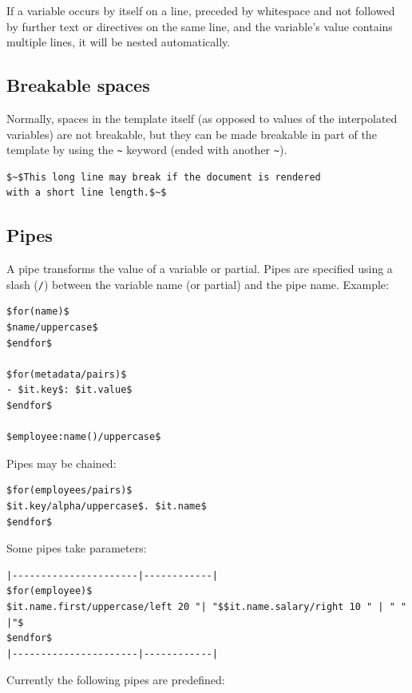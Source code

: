 \documentclass[
  b5paper
]{book}
\begin{document}
If a variable occurs by itself on a line, preceded by whitespace and not
followed by further text or directives on the same line, and the
variable's value contains multiple lines, it will be nested
automatically.

\subsection{Breakable spaces}\label{breakable-spaces}

Normally, spaces in the template itself (as opposed to values of the
interpolated variables) are not breakable, but they can be made
breakable in part of the template by using the
\texttt{\textasciitilde{}} keyword (ended with another
\texttt{\textasciitilde{}}).

\begin{verbatim}
$~$This long line may break if the document is rendered
with a short line length.$~$
\end{verbatim}

\subsection{Pipes}\label{pipes}

A pipe transforms the value of a variable or partial. Pipes are
specified using a slash (\texttt{/}) between the variable name (or
partial) and the pipe name. Example:

\begin{verbatim}
$for(name)$
$name/uppercase$
$endfor$

$for(metadata/pairs)$
- $it.key$: $it.value$
$endfor$

$employee:name()/uppercase$
\end{verbatim}

Pipes may be chained:

\begin{verbatim}
$for(employees/pairs)$
$it.key/alpha/uppercase$. $it.name$
$endfor$
\end{verbatim}

Some pipes take parameters:

\begin{verbatim}
|----------------------|------------|
$for(employee)$
$it.name.first/uppercase/left 20 "| "$$it.name.salary/right 10 " | " " |"$
$endfor$
|----------------------|------------|
\end{verbatim}

Currently the following pipes are predefined:
\end{document}
